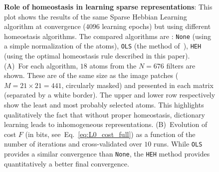 \documentclass[vision,article,submit,oneauthor,pdftex]{Definitions/mdpi}
\newcommand{\seeEq}[1]{Eq.~\ref{eq:#1}}%
\begin{document}
\begin{figure}%
\caption{
{\bf Role of homeostasis in learning sparse representations}:
This plot shows the results of the same Sparse Hebbian Learning algorithm at convergence ($4096$ learning epochs) but using different homeostasis algorithms. The compared algorithms are : \texttt{None} (using a simple normalization of the atoms), \texttt{OLS} (the method of~\citep{Olshausen97}), \texttt{HEH} (using the optimal homeostasis rule described in this paper). {\sf (A)}~For each algorithm, $18$ atoms from the $N=676$ filters are shown. These are of the same size as the image patches ($M= 21 \times 21=441$, circularly masked) and presented in each matrix (separated by a white border). The upper and lower row respectively show the least and most probably selected atoms. This highlights qualitatively the fact that without proper homeostasis, dictionary learning leads to inhomogeneous representations. {\sf (B)}~Evolution of cost $F$ (in bits, see~\seeEq{L0_cost_full}) as a function of the number of iterations and cross-validated over $10$ runs. While \texttt{OLS} provides a similar convergence than \texttt{None}, the \texttt{HEH} method provides quantitatively a better final convergence. %
\label{fig:map}}%
\end{figure}%
\end{document}
